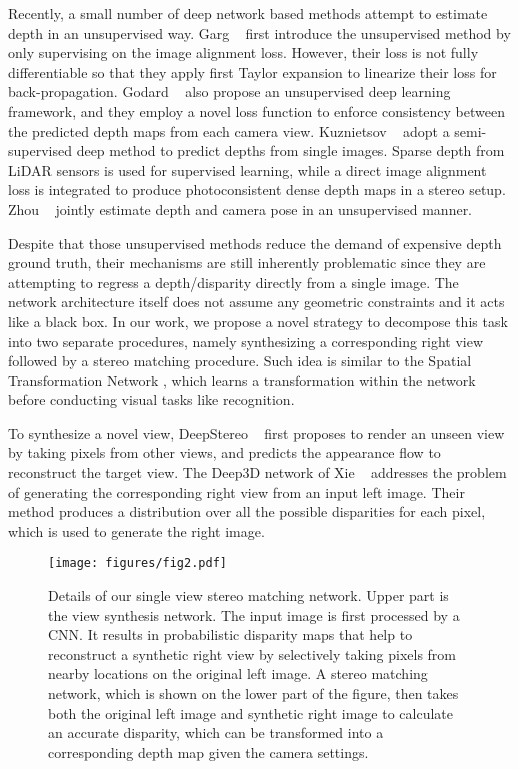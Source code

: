 \documentclass[10pt,twocolumn,letterpaper]{article}
\begin{document}
Recently, a small number of deep network based methods attempt to estimate depth in an unsupervised way. Garg \etal~\cite{garg2016unsupervised} first introduce the unsupervised method by only supervising on the image alignment loss. However, their loss is not fully differentiable so that they apply first Taylor expansion to linearize their loss for back-propagation. Godard \etal~\cite{godard2016unsupervised} also propose an unsupervised deep learning framework, and they employ a novel loss function to enforce consistency between the predicted depth maps from each camera view. Kuznietsov \etal~\cite{kuznietsov2017semi} adopt a semi-supervised deep method to predict depths from single images. Sparse depth from LiDAR sensors is used for supervised learning, while a direct image alignment loss is integrated to produce photoconsistent dense depth maps in a stereo setup. Zhou \etal~\cite{zhou2017unsupervised} jointly estimate depth and camera pose in an unsupervised manner.

Despite that those unsupervised methods reduce the demand of expensive depth ground truth, their mechanisms are still inherently problematic since they are attempting to regress a depth/disparity directly from a single image. The network architecture itself does not assume any geometric constraints and it acts like a black box. In our work, we propose a novel strategy to decompose this task into two separate procedures, namely synthesizing a corresponding right view followed by a stereo matching procedure. Such idea is similar to the Spatial Transformation Network \cite{Jaderberg2015STN}, which learns a transformation within the network before conducting visual tasks like recognition.

To synthesize a novel view, DeepStereo ~\cite{flynn2015deepStereo} first proposes to render an unseen view by taking pixels from other views, and \cite{zhou2016view} predicts the appearance flow to reconstruct the target view. The Deep3D network of Xie \etal~\cite{xie2016deep3d} addresses the problem of generating the corresponding right view from an input left image. Their method produces a distribution over all the possible disparities for each pixel, which is used to generate the right image.

\begin{figure*}[t!]
  \texttt{[image: figures/fig2.pdf]}
  \vspace{-20pt}
  \caption{Details of our single view stereo matching network. Upper part is the view synthesis network. The input image is first processed by a CNN. It results in probabilistic disparity maps that help to reconstruct a synthetic right view by selectively taking pixels from nearby locations on the original left image. A stereo matching network, which is shown on the lower part of the figure, then takes both the original left image and synthetic right image to calculate an accurate disparity, which can be transformed into a corresponding depth map given the camera settings.}
  \label{figure2}
  \vspace{-15pt}
\end{figure*}
\end{document}
